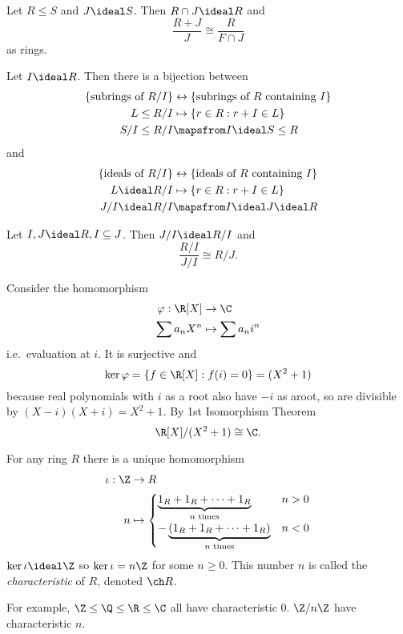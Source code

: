 \documentclass[a4paper]{article}
\theoremstyle{definition}
\begin{document}
\begin{theorem}
  Let \(R \leq S\) and \(J \ideal S\). Then \(R \cap J \ideal R\) and
  \[
    \frac{R + J}{J} \cong \frac{R}{F \cap J}
  \]
  as rings.
\end{theorem}

\begin{theorem}
  Let \(I \ideal R\). Then there is a bijection between
  \begin{align*}
    \{\text{subrings of } R/I\} &\leftrightarrow \{\text{subrings of } R \text{ containing } I\} \\
    L \leq R/I &\mapsto \{r \in R: r + I \in L\} \\
    S/I \leq R/I &\mapsfrom I \ideal S \leq R
  \end{align*}
  and
  \begin{align*}
    \{\text{ideals of } R/I\} &\leftrightarrow \{\text{ideals of } R \text{ containing } I\} \\
    L \ideal R/I &\mapsto \{r \in R: r + I \in L\} \\
    J/I \ideal R/I &\mapsfrom I \ideal J \ideal R
  \end{align*}
\end{theorem}

\begin{theorem}
  Let \(I, J \ideal R, I \subseteq J\). Then \(J/I \ideal R/I\) and
  \[
    \frac{R/I}{J/I} \cong R/J.
  \]
\end{theorem}

\begin{eg}
  Consider the homomorphism
  \begin{align*}
    \varphi: \R[X] &\to \C \\
    \sum a_nX^n &\mapsto \sum a_n i^n
  \end{align*}
  i.e.\ evaluation at \(i\). It is surjective and
  \[
    \ker \varphi = \{f \in \R[X]: f(i) = 0\} = (X^2 + 1)
  \]
  because real polynomials with \(i\) as a root also have \(-i\) as aroot, so are divisible by \((X - i)(X + i) = X^2 + 1\). By 1st Isomorphism Theorem
  \[
    \R[X]/(X^2 + 1) \cong \C.
  \]
\end{eg}

\begin{eg}
  For any ring \(R\) there is a unique homomorphism
  \begin{align*}
    \iota: \Z &\to R \\
    n &\mapsto
        \begin{cases}
          \underbrace{1_R + 1_R + \dots + 1_R}_{n \text{ times}} & n > 0 \\
          -\underbrace{(1_R + 1_R + \dots + 1_R)}_{n \text{ times}} & n < 0
        \end{cases}
  \end{align*}
  \(\ker \iota \ideal \Z\) so \(\ker \iota = n\Z\) for some \(n \geq 0\). This number \(n\) is called the \emph{characteristic} of \(R\), denoted \(\ch R\).

  For example, \(\Z \leq \Q \leq \R \leq \C\) all have characteristic \(0\). \(\Z/n\Z\) have characteristic \(n\).
\end{eg}
\end{document}
